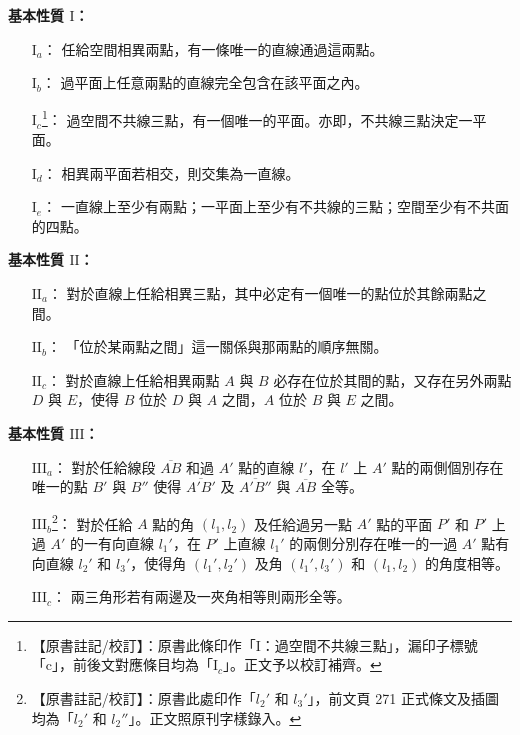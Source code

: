 \noindent\textbf{基本性質 $\mathrm{I}$：}
\begin{itemize}[leftmargin=2.8em, itemsep=0.2em]
  \item[$\mathrm{I}_a$：]任給空間相異兩點，有一條唯一的直線通過這兩點。
  \item[$\mathrm{I}_b$：]過平面上任意兩點的直線完全包含在該平面之內。
  \item[$\mathrm{I}_c$\phantomsection\label{note:b3s-a1-p277-ic}\footnote{【原書註記/校訂】：原書此條印作「$\mathrm{I}$：過空間不共線三點」，漏印子標號「c」，前後文對應條目均為「$\mathrm{I}_c$」。正文予以校訂補齊。}：]過空間不共線三點，有一個唯一的平面。亦即，不共線三點決定一平面。
  \item[$\mathrm{I}_d$：]相異兩平面若相交，則交集為一直線。
  \item[$\mathrm{I}_e$：]一直線上至少有兩點；一平面上至少有不共線的三點；空間至少有不共面的四點。
\end{itemize}

\noindent\textbf{基本性質 $\mathrm{II}$：}
\begin{itemize}[leftmargin=2.8em, itemsep=0.2em]
  \item[$\mathrm{II}_a$：]對於直線上任給相異三點，其中必定有一個唯一的點位於其餘兩點之間。
  \item[$\mathrm{II}_b$：]「位於某兩點之間」這一關係與那兩點的順序無關。
  \item[$\mathrm{II}_c$：]對於直線上任給相異兩點 $A$ 與 $B$ 必存在位於其間的點，又存在另外兩點 $D$ 與 $E$，使得 $B$ 位於 $D$ 與 $A$ 之間，$A$ 位於 $B$ 與 $E$ 之間。
\end{itemize}

\noindent\textbf{基本性質 $\mathrm{III}$：}
\begin{itemize}[leftmargin=2.8em, itemsep=0.2em]
  \item[$\mathrm{III}_a$：]對於任給線段 $\overline{AB}$ 和過 $A'$ 點的直線 $l'$，在 $l'$ 上 $A'$ 點的兩側個別存在唯一的點 $B'$ 與 $B''$ 使得 $\overline{A'B'}$ 及 $\overline{A'B''}$ 與 $\overline{AB}$ 全等。
  \item[$\mathrm{III}_b$\phantomsection\label{note:b3s-a1-p278-l3p}\footnote{【原書註記/校訂】：原書此處印作「$l_2'$ 和 $l_3'$」，前文頁 271 正式條文及插圖均為「$l_2'$ 和 $l_2''$」。正文照原刊字樣錄入。}：]對於任給 $A$ 點的角 $(l_1, l_2)$ 及任給過另一點 $A'$ 點的平面 $P'$ 和 $P'$ 上過 $A'$ 的一有向直線 $l_1'$，在 $P'$ 上直線 $l_1'$ 的兩側分別存在唯一的一過 $A'$ 點有向直線 $l_2'$ 和 $l_3'$，使得角 $(l_1', l_2')$ 及角 $(l_1', l_3')$ 和 $(l_1, l_2)$ 的角度相等。
  \item[$\mathrm{III}_c$：]兩三角形若有兩邊及一夾角相等則兩形全等。
\end{itemize}

